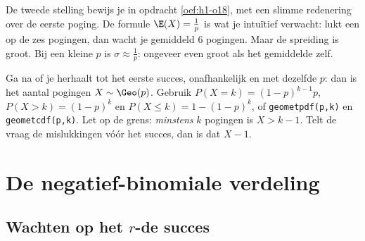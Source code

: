 De tweede stelling bewijs je in opdracht \ref{oef:h1-o18}, met een slimme redenering over de eerste poging. De formule $\E(X) = \frac1p$ is wat je intuïtief verwacht: lukt een op de zes pogingen, dan wacht je gemiddeld 6 pogingen. Maar de spreiding is groot. Bij een kleine $p$ is $\sigma \approx \frac1p$: ongeveer even groot als het gemiddelde zelf.


\begin{werkwijze}
Ga na of je herhaalt tot het eerste succes, onafhankelijk en met dezelfde $p$: dan is het aantal pogingen $X \sim \Geo(p)$. Gebruik $P(X = k) = (1 - p)^{k-1}p$, $P(X > k) = (1 - p)^k$ en $P(X \leqslant k) = 1 - (1 - p)^k$, of \texttt{geometpdf(p,k)} en \texttt{geometcdf(p,k)}. Let op de grens: \textit{minstens} $k$ pogingen is $X > k - 1$. Telt de vraag de mislukkingen vóór het succes, dan is dat $X - 1$.
\end{werkwijze}

\begin{oefeningen}
\end{oefeningen}

\section{De negatief-binomiale verdeling}

\subsection{Wachten op het $r$-de succes}

